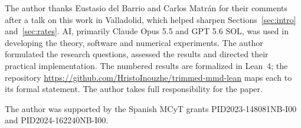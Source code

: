 \begin{acks}[Acknowledgments]
The author thanks Eustasio del Barrio and Carlos Matr\'an for their comments after a talk on this work in Valladolid,
which helped sharpen Sections~\ref{sec:intro} and~\ref{sec:rates}. AI, primarily Claude Opus 5.5 and GPT 5.6 SOL, was used in developing the theory, software and numerical
experiments. The author formulated the research questions, assessed the results and directed their practical
implementation. The numbered results are formalized in Lean~4; the repository
\url{https://github.com/HristoInouzhe/trimmed-mmd-lean} maps each to its formal statement. The author takes full responsibility for the paper.
\end{acks}

\begin{funding}
The author was supported by the Spanish MCyT grants PID2023-148081NB-I00 and PID2024-162240NB-I00.
\end{funding}

\begin{supplement}
\end{supplement}

\begin{supplement}
\end{supplement}
